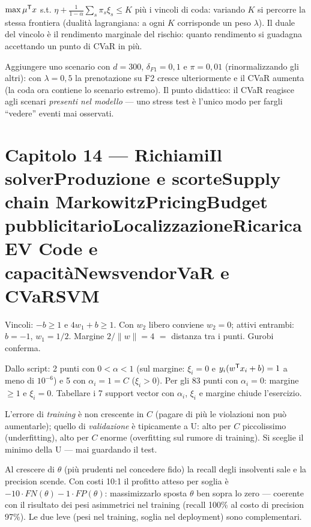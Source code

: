 \documentclass[11pt,a4paper]{article}
\newcounter{cap}
\newcounter{sol}[cap]
\newcommand{\capitolo}[1]{\setcounter{cap}{#1}\section*{Capitolo #1 --- \capnome{#1}}}
\newcommand{\capnome}[1]{%
  \ifcase#1\or\or Richiami\or Il solver\or Produzione e scorte\or Supply chain\or
  Markowitz\or Pricing\or Budget pubblicitario\or Localizzazione\or Ricarica EV\or
  Code e capacità\or Newsvendor\or VaR e CVaR\or SVM\fi}
\begin{document}
\begin{soluzione}
$\max \mu^{\mathsf T} x$ s.t. $\eta + \frac{1}{1-\alpha}\sum_s \pi_s \xi_s \le K$ più i vincoli
di coda: variando $K$ si percorre la stessa frontiera (dualità lagrangiana: a ogni
$K$ corrisponde un peso $\lambda$). Il duale del vincolo è il rendimento marginale
del rischio: quanto rendimento si guadagna accettando un punto di CVaR in più.
\end{soluzione}

\begin{soluzione}
Aggiungere uno scenario con $d = 300$, $\delta_{F1} = 0{,}1$ e $\pi = 0{,}01$
(rinormalizzando gli altri): con $\lambda = 0{,}5$ la prenotazione su F2 cresce
ulteriormente e il CVaR aumenta (la coda ora contiene lo scenario estremo). Il
punto didattico: il CVaR reagisce agli scenari \emph{presenti nel modello} --- uno
stress test è l'unico modo per fargli ``vedere'' eventi mai osservati.
\end{soluzione}

\capitolo{14}

\begin{soluzione}[verifica]
Vincoli: $-b \ge 1$ e $4w_1 + b \ge 1$. Con $w_2$ libero conviene $w_2 = 0$;
attivi entrambi: $b = -1$, $w_1 = 1/2$. Margine $2/\|w\| = 4$ $=$ distanza tra i
punti. Gurobi conferma.
\end{soluzione}

\begin{soluzione}[complementarietà]
Dallo script: 2 punti con $0 < \alpha < 1$ (sul margine: $\xi_i = 0$ e
$y_i(w^{\mathsf T} x_i + b) = 1$ a meno di $10^{-6}$) e 5 con $\alpha_i = 1 = C$
($\xi_i > 0$). Per gli 83 punti con $\alpha_i = 0$: margine $\ge 1$ e $\xi_i = 0$.
Tabellare i 7 support vector con $\alpha_i$, $\xi_i$ e margine chiude l'esercizio.
\end{soluzione}

\begin{soluzione}
L'errore di \emph{training} è non crescente in $C$ (pagare di più le violazioni non
può aumentarle); quello di \emph{validazione} è tipicamente a U: alto per $C$
piccolissimo (underfitting), alto per $C$ enorme (overfitting sul rumore di
training). Si sceglie il minimo della U --- mai guardando il test.
\end{soluzione}

\begin{soluzione}
Al crescere di $\theta$ (più prudenti nel concedere fido) la recall degli insolventi
sale e la precision scende. Con costi 10:1 il profitto atteso per soglia è
$-10 \cdot FN(\theta) - 1 \cdot FP(\theta)$: massimizzarlo sposta $\theta$ ben sopra
lo zero --- coerente con il risultato dei pesi asimmetrici nel training
(recall 100\% al costo di precision 97\%). Le due leve (pesi nel training, soglia nel
deployment) sono complementari.
\end{soluzione}
\end{document}
